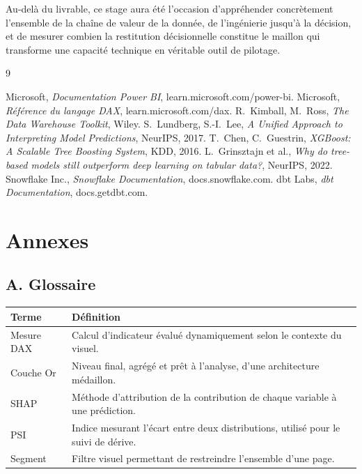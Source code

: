 \documentclass[12pt,a4paper,oneside]{report}
\begin{document}
Au-delà du livrable, ce stage aura été l'occasion d'appréhender concrètement l'ensemble de la chaîne de valeur de la donnée, de l'ingénierie jusqu'à la décision, et de mesurer combien la restitution décisionnelle constitue le maillon qui transforme une capacité technique en véritable outil de pilotage.

\begin{thebibliography}{9}
 Microsoft, \emph{Documentation Power BI}, learn.microsoft.com/power-bi.
 Microsoft, \emph{Référence du langage DAX}, learn.microsoft.com/dax.
 R.\ Kimball, M.\ Ross, \emph{The Data Warehouse Toolkit}, Wiley.
 S.\ Lundberg, S.-I.\ Lee, \emph{A Unified Approach to Interpreting Model Predictions}, NeurIPS, 2017.
 T.\ Chen, C.\ Guestrin, \emph{XGBoost: A Scalable Tree Boosting System}, KDD, 2016.
 L.\ Grinsztajn et al., \emph{Why do tree-based models still outperform deep learning on tabular data?}, NeurIPS, 2022.
 Snowflake Inc., \emph{Snowflake Documentation}, docs.snowflake.com.
 dbt Labs, \emph{dbt Documentation}, docs.getdbt.com.
\end{thebibliography}

\appendix
\chapter{Annexes}

\section*{A. Glossaire}
\begin{tabularx}{\textwidth}{lX}
\toprule
\textbf{Terme} & \textbf{Définition} \\
\midrule
Mesure DAX & Calcul d'indicateur évalué dynamiquement selon le contexte du visuel. \\
Couche Or & Niveau final, agrégé et prêt à l'analyse, d'une architecture médaillon. \\
SHAP & Méthode d'attribution de la contribution de chaque variable à une prédiction. \\
PSI & Indice mesurant l'écart entre deux distributions, utilisé pour le suivi de dérive. \\
Segment & Filtre visuel permettant de restreindre l'ensemble d'une page. \\
\bottomrule
\end{tabularx}
\end{document}
